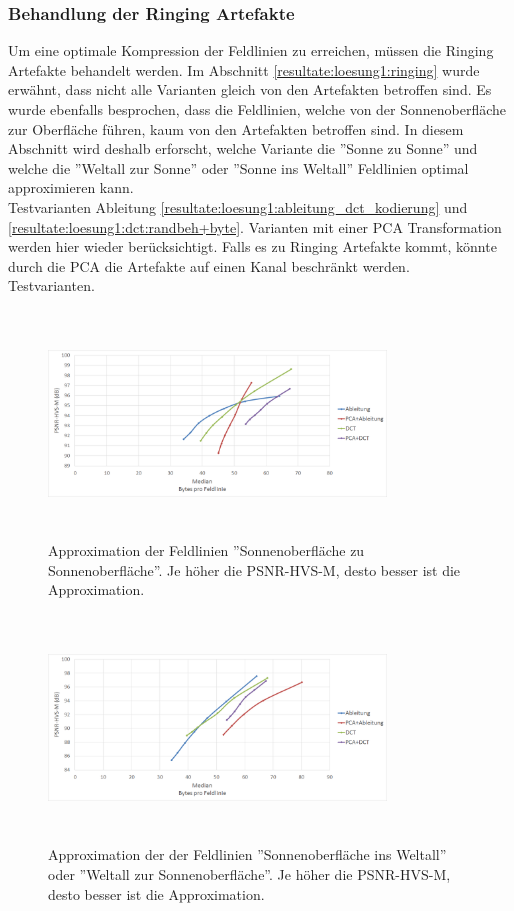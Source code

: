 \subsubsection{Behandlung der Ringing Artefakte}
Um eine optimale Kompression der Feldlinien zu erreichen, müssen die Ringing Artefakte behandelt werden. Im Abschnitt \ref{resultate:loesung1:ringing} wurde erwähnt, dass nicht alle Varianten gleich von den Artefakten betroffen sind. Es wurde ebenfalls besprochen, dass die Feldlinien, welche von der Sonnenoberfläche zur Oberfläche führen, kaum von den Artefakten betroffen sind. In diesem Abschnitt wird deshalb erforscht, welche Variante die ''Sonne zu Sonne'' und welche die ''Weltall zur Sonne'' oder ''Sonne ins Weltall'' Feldlinien optimal approximieren kann.\\
Testvarianten Ableitung \ref{resultate:loesung1:ableitung_dct_kodierung} und \ref{resultate:loesung1:dct:randbeh+byte}.
Varianten mit einer PCA Transformation werden hier wieder berücksichtigt. Falls es zu Ringing Artefakte kommt, könnte durch die PCA die Artefakte auf einen Kanal beschränkt werden.\\
Testvarianten.
\begin{figure}[!htbp]
	\center
	\includegraphics[width=0.8\textwidth,height=6cm,keepaspectratio]{./pictures/resultate/loesung1/ringing/sts.png}
	\caption{Approximation der Feldlinien ''Sonnenoberfläche zu Sonnenoberfläche''. Je höher die PSNR-HVS-M, desto besser ist die Approximation. }
	\label{resultate:loesung1:dct:behandlung_ringing:sts}
\end{figure} 
\begin{figure}[!htbp]
	\center
	\includegraphics[width=0.8\textwidth,height=6cm,keepaspectratio]{./pictures/resultate/loesung1/ringing/nosts.png}
	\caption{Approximation der der Feldlinien ''Sonnenoberfläche ins Weltall'' oder ''Weltall zur Sonnenoberfläche''. Je höher die PSNR-HVS-M, desto besser ist die Approximation.}
	\label{resultate:loesung1:dct:behandlung_ringing:nosts}
\end{figure}
